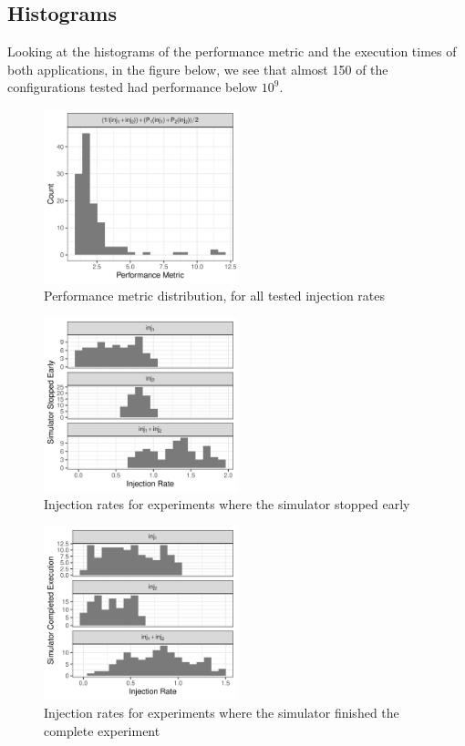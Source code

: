 \documentclass[a4paper]{article}
\begin{document}
\subsection{Histograms}
\label{sec:org23ec2c3}
Looking at the  histograms of the performance metric and  the execution times of
both  applications,  in  the  figure  below,  we see  that  almost  150  of  the
configurations tested had performance below \(10^{9}\).

\begin{figure}[htbp]
\centering
\includegraphics[width=0.5\textwidth]{./img/2_apps_min_mean_time/rs_20_samples_10_iterations_histogram_weighted_full.pdf}
\caption{Performance metric distribution, for all tested injection rates}
\end{figure}

\begin{figure}[htbp]
\centering
\includegraphics[width=0.5\textwidth]{./img/2_apps_min_mean_time/rs_20_samples_10_iterations_histogram_failed_weighted_full.pdf}
\caption{Injection rates for experiments where the simulator stopped early}
\end{figure}

\begin{figure}[htbp]
\centering
\includegraphics[width=0.5\textwidth]{./img/2_apps_min_mean_time/rs_20_samples_10_iterations_histogram_success_weighted_full.pdf}
\caption{Injection rates for experiments where the simulator finished the complete experiment}
\end{figure}
\end{document}
